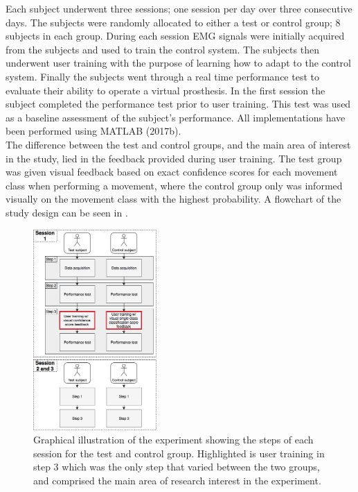 Each subject underwent three sessions; one session per day over three consecutive days. The subjects were randomly allocated to either a test or control group; 8 subjects in each group. During each session EMG signals were initially acquired from the subjects and used to train the control system. The subjects then underwent user training with the purpose of learning how to adapt to the control system. Finally the subjects went through a real time performance test to evaluate their ability to operate a virtual prosthesis. In the first session the subject completed the performance test prior to user training. This test was used as a baseline assessment of the subject's performance. All implementations have been performed using MATLAB (2017b). \\
The difference between the test and control groups, and the main area of interest in the study, lied in the feedback provided during user training. The test group was given visual feedback based on exact confidence scores for each movement class when performing a movement, where the control group only was informed visually on the movement class with the highest probability. A flowchart of the study design can be seen in .


\begin{figure}[H]                                         
	\includegraphics[width=0.42\textwidth]{figures/Paper/Study_design}  
	\caption{Graphical illustration of the experiment showing the steps of each session for the test and control group. Highlighted is user training in step 3 which was the only step that varied between the two groups, and comprised the main area of research interest in the experiment.}
	\label{fig:P:std} 
\end{figure}
